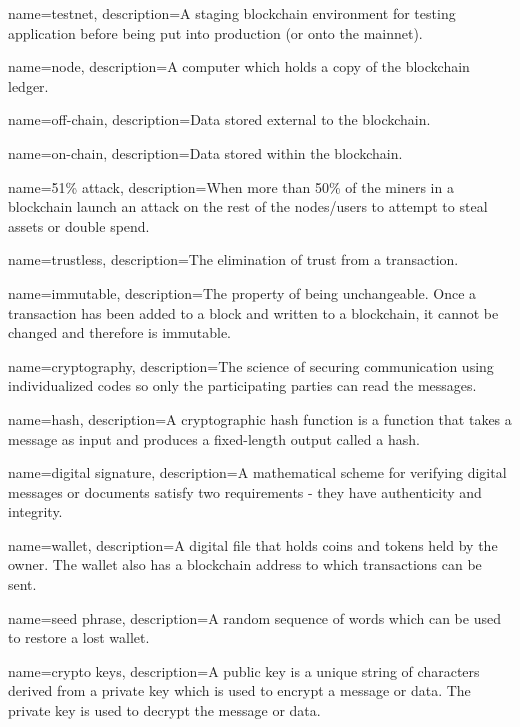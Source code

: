  {
	name=testnet,
	description={A staging blockchain environment for testing application before being put into production (or onto the mainnet).}
}

 {
	name=node,
	description={A computer which holds a copy of the blockchain ledger.}
}

 {
	name=off-chain,
	description={Data stored external to the blockchain.}
}

 {
	name=on-chain,
	description={Data stored within the blockchain.}
}


 {
	name=51\% attack,
	description={When more than 50\% of the miners in a blockchain launch an attack on the rest of the nodes/users to attempt to steal assets or double spend.}
}

 {
	name=trustless,
	description={The elimination of trust from a transaction.}
}

 {
	name=immutable,
	description={The property of being unchangeable. Once a transaction has been added to a block and written to a blockchain, it cannot be changed and therefore is immutable.}
}

 {
	name=cryptography,
	description={The science of securing communication using individualized codes so only the participating parties can read the messages.}
}

 {
	name=hash,
	description={A cryptographic hash function is a function that takes a message as input and produces a fixed-length output called a hash.}
}

 {
	name=digital signature,
	description={A mathematical scheme for verifying digital messages or documents satisfy two requirements - they have authenticity and integrity.}
}

 {
	name=wallet,
	description={A digital file that holds coins and tokens held by the owner. The wallet also has a blockchain address to which transactions can be sent.}
}

 {
	name=seed phrase,
	description={A random sequence of words which can be used to restore a lost wallet.}
}

 {
	name=crypto keys,
	description={A public key is a unique string of characters derived from a private key which is used to encrypt a message or data. The private key is used to decrypt the message or data.}
}

